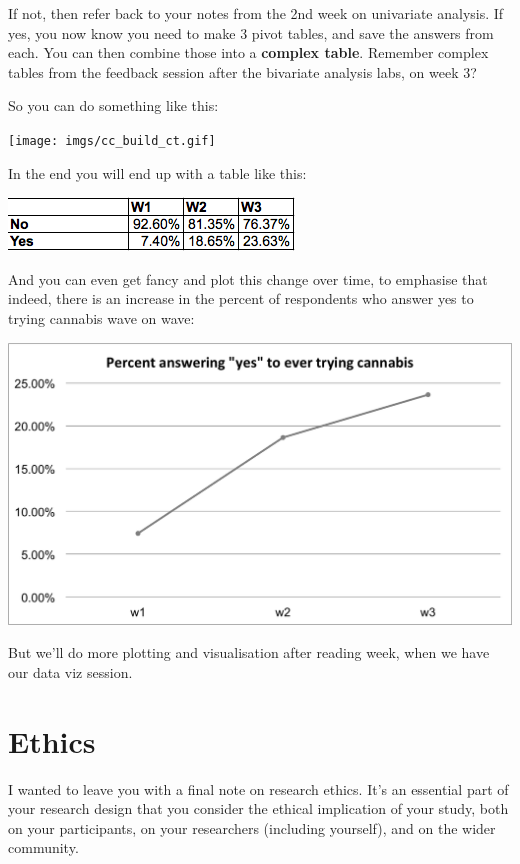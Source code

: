 \documentclass[
]{book}
\begin{document}
If not, then refer back to your notes from the 2nd week on univariate analysis. If yes, you now know you need to make 3 pivot tables, and save the answers from each. You can then combine those into a \textbf{complex table}. Remember complex tables from the feedback session after the bivariate analysis labs, on week 3?

So you can do something like this:

\texttt{[image: imgs/cc\_build\_ct.gif]}

In the end you will end up with a table like this:

\includegraphics{imgs/final_cc_ct.png}

And you can even get fancy and plot this change over time, to emphasise that indeed, there is an increase in the percent of respondents who answer yes to trying cannabis wave on wave:

\includegraphics{imgs/incr_yes_can.png}

But we'll do more plotting and visualisation after reading week, when we have our data viz session.

\hypertarget{ethics}{%
\section{Ethics}\label{ethics}}

I wanted to leave you with a final note on research ethics. It's an essential part of your research design that you consider the ethical implication of your study, both on your participants, on your researchers (including yourself), and on the wider community.
\end{document}
